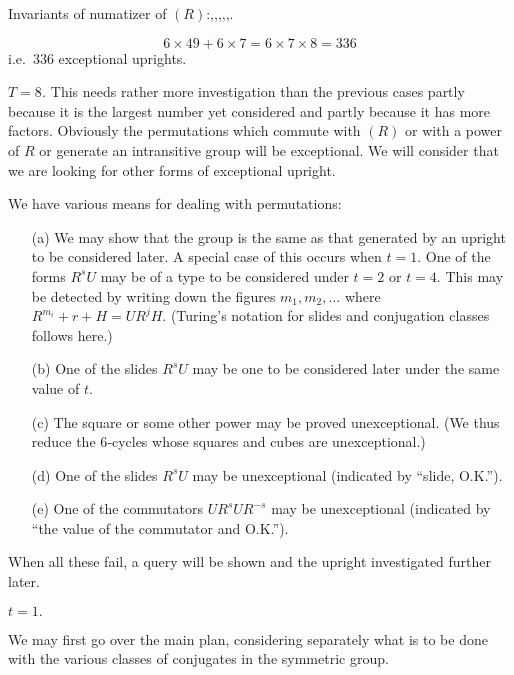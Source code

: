 \documentclass[12pt]{article}
\begin{document}
\smallskip

\noindent
Invariants of numatizer of $(R)$:,,,,,.

\[
6 \times 49 + 6 \times 7 = 6 \times 7 \times 8 = 336
\]
i.e.\ 336 exceptional uprights.

\bigskip

\noindent
{\em $T = 8$.}
This needs rather more investigation than the previous cases partly because it is the largest number yet considered and partly because it has more factors. Obviously the permutations which commute with $(R)$ or with a power of $R$ or generate an intransitive group will be exceptional. We will consider that we are looking for other forms of exceptional upright.

\medskip

We have various means for dealing with permutations:

\begin{itemize}
\item[(a)] We may show that the group is the same as that generated by an upright to be considered later. A special case of this occurs when $t = 1$. One of the forms $R^s U$ may be of a type to be considered under $t=2$ or $t=4$. This may be detected by writing down the figures $m_1, m_2, \dots$ where $R^{m_i} + r + H = UR^{j} H$. (Turing’s notation for slides and conjugation classes follows here.)
\item[(b)] One of the slides $R^s U$ may be one to be considered later under the same value of $t$.
\item[(c)] The square or some other power may be proved unexceptional. (We thus reduce the 6‐cycles whose squares and cubes are unexceptional.)
\item[(d)] One of the slides $R^s U$ may be unexceptional (indicated by “slide, O.K.”).
\item[(e)] One of the commutators $U R^s U R^{-s}$ may be unexceptional (indicated by “the value of the commutator and O.K.”).
\end{itemize}

When all these fail, a query will be shown and the upright investigated further later.

\bigskip

\noindent
$t = 1.$

\smallskip

We may first go over the main plan, considering separately what is to be done with the various classes of conjugates in the symmetric group.
\end{document}
